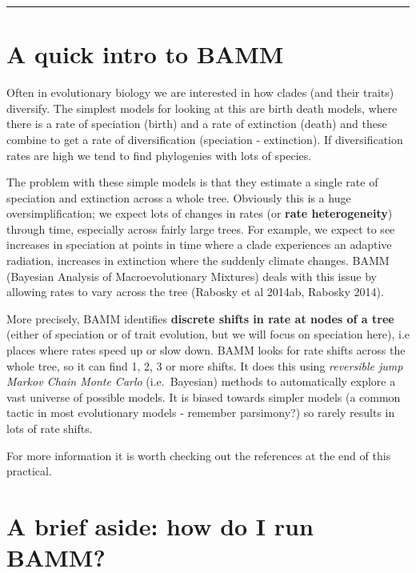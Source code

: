 \documentclass[]{book}
\begin{document}
\begin{center}\rule{0.5\linewidth}{\linethickness}\end{center}

\section{A quick intro to BAMM}\label{a-quick-intro-to-bamm}

Often in evolutionary biology we are interested in how clades (and their
traits) diversify. The simplest models for looking at this are birth
death models, where there is a rate of speciation (birth) and a rate of
extinction (death) and these combine to get a rate of diversification
(speciation - extinction). If diversification rates are high we tend to
find phylogenies with lots of species.

The problem with these simple models is that they estimate a single rate
of speciation and extinction across a whole tree. Obviously this is a
huge oversimplification; we expect lots of changes in rates (or
\textbf{rate heterogeneity}) through time, especially across fairly
large trees. For example, we expect to see increases in speciation at
points in time where a clade experiences an adaptive radiation,
increases in extinction where the suddenly climate changes. BAMM
(Bayesian Analysis of Macroevolutionary Mixtures) deals with this issue
by allowing rates to vary across the tree (Rabosky et al 2014ab, Rabosky
2014).

More precisely, BAMM identifies \textbf{discrete shifts in rate at nodes
of a tree} (either of speciation or of trait evolution, but we will
focus on speciation here), i.e places where rates speed up or slow down.
BAMM looks for rate shifts across the whole tree, so it can find 1, 2, 3
or more shifts. It does this using \emph{reversible jump Markov Chain
Monte Carlo} (i.e.~Bayesian) methods to automatically explore a vast
universe of possible models. It is biased towards simpler models (a
common tactic in most evolutionary models - remember parsimony?) so
rarely results in lots of rate shifts.

For more information it is worth checking out the references at the end
of this practical.

\section{A brief aside: how do I run
BAMM?}\label{a-brief-aside-how-do-i-run-bamm}
\end{document}
